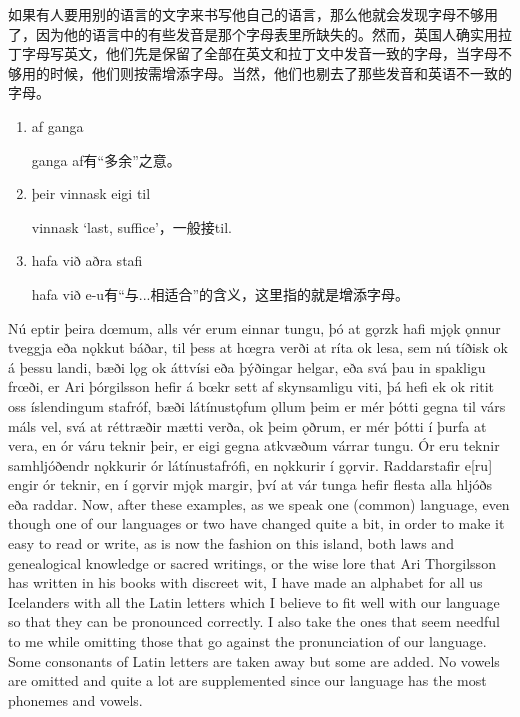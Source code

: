 \begin{translation*}{}
  如果有人要用别的语言的文字来书写他自己的语言，那么他就会发现字母不够用了，因为他的语言中的有些发音是那个字母表里所缺失的。然而，英国人确实用拉丁字母写英文，他们先是保留了全部在英文和拉丁文中发音一致的字母，当字母不够用的时候，他们则按需增添字母。当然，他们也剔去了那些发音和英语不一致的字母。
\end{translation*}
\begin{grammar*}{}
  \begin{enumerate}[leftmargin=*]
    \item af ganga

          ganga af有“多余”之意。

    \item þeir vinnask eigi til

          vinnask `last, suffice'，一般接til.

    \item hafa við aðra stafi

          hafa við e-u有“与...相适合”的含义，这里指的就是增添字母。
  \end{enumerate}
\end{grammar*}
\begin{paracol}{2}
  Nú eptir þeira dœmum, alls vér erum einnar tungu, þó at gǫrzk hafi mjǫk ǫnnur tveggja eða nǫkkut báðar, til þess at hœgra verði at ríta ok lesa, sem nú tíðisk ok á þessu landi, bæði lǫg ok áttvísi eða þýðingar helgar, eða svá þau in spakligu frœði, er Ari þórgilsson hefir á bœkr sett af skynsamligu viti, þá hefi ek ok ritit oss íslendingum stafróf, bæði látínustǫfum ǫllum þeim er mér þótti gegna til várs máls vel, svá at réttræðir mætti verða, ok þeim ǫðrum, er mér þótti í þurfa at vera, en ór váru teknir þeir, er eigi gegna atkvæðum várrar tungu. Ór eru teknir samhljóðendr nǫkkurir ór látínustafrófi, en nǫkkurir í gǫrvir. Raddarstafir e[ru] engir ór teknir, en í gǫrvir mjǫk margir, því at vár tunga hefir flesta alla hljóðs eða raddar.
  \switchcolumn
  Now, after these examples, as we speak one (common) language, even though one of our languages or two have changed quite a bit, in order to make it easy to read or write, as is now the fashion on this island, both laws and genealogical knowledge or sacred writings, or the wise lore that Ari Thorgilsson has written in his books with discreet wit, I have made an alphabet for all us Icelanders with all the Latin letters which I believe to fit well with our language so that they can be pronounced correctly. I also take the ones that seem needful to me while omitting those that go against the pronunciation of our language. Some consonants of Latin letters are taken away but some are added. No vowels are omitted and quite a lot are supplemented since our language has the most phonemes and vowels.
\end{paracol}
